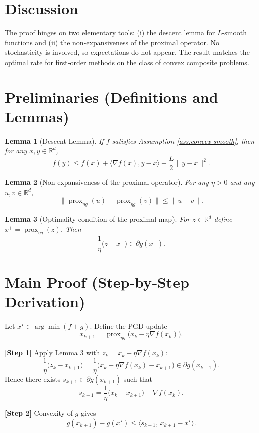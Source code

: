 \documentclass{article}
\newtheorem{lemma}{Lemma}
\newcommand{\prox}{\operatorname{prox}}
\newcommand{\R}{\mathbb{R}}
\begin{document}
\section*{Discussion}
The proof hinges on two elementary tools: (i) the descent lemma for $L$‑smooth functions and (ii) the non‑expansiveness of the proximal operator. No stochasticity is involved, so expectations do not appear. The result matches the optimal rate for first‑order methods on the class of convex composite problems.

\newpage
\section*{Preliminaries (Definitions and Lemmas)}
\begin{lemma}[Descent Lemma]\label{lem:descent}
If $f$ satisfies Assumption \ref{ass:convex-smooth}, then for any $x,y\in\R^{d}$,
\[
f(y)\le f(x)+\langle\nabla f(x),y-x\rangle+\frac{L}{2}\|y-x\|^{2}.
\]
\end{lemma}
\begin{lemma}[Non‑expansiveness of the proximal operator]\label{lem:nonexp}
For any $\eta>0$ and any $u,v\in\R^{d}$,
\[
\bigl\|\prox_{\eta g}(u)-\prox_{\eta g}(v)\bigr\|\le\|u-v\|.
\]
\end{lemma}
\begin{lemma}[Optimality condition of the proximal map]\label{lem:optcond}
For $z\in\R^{d}$ define $x^{+}= \prox_{\eta g}(z)$. Then  
\[
\frac{1}{\eta}\bigl(z-x^{+}\bigr)\in\partial g(x^{+}).
\]
\end{lemma}

\newpage
\section*{Main Proof (Step‑by‑Step Derivation)}
Let $x^{\star}\in\arg\min (f+g)$. Define the PGD update
\[
x_{k+1}= \prox_{\eta g}\!\bigl(x_{k}-\eta\nabla f(x_{k})\bigr).
\]

\noindent\textbf{[Step 1]} Apply Lemma \ref{lem:optcond} with $z_{k}=x_{k}-\eta\nabla f(x_{k})$:
\[
\frac{1}{\eta}\bigl(z_{k}-x_{k+1}\bigr)=\frac{1}{\eta}\bigl(x_{k}-\eta\nabla f(x_{k})-x_{k+1}\bigr)\in\partial g(x_{k+1}).
\]
Hence there exists $s_{k+1}\in\partial g(x_{k+1})$ such that
\[
s_{k+1}= \frac{1}{\eta}\bigl(x_{k}-x_{k+1}\bigr)-\nabla f(x_{k}). \tag{1}
\]

\noindent\textbf{[Step 2]} Convexity of $g$ gives
\[
g(x_{k+1})-g(x^{\star})\le \langle s_{k+1},\,x_{k+1}-x^{\star}\rangle . \tag{2}
\]
\end{document}
